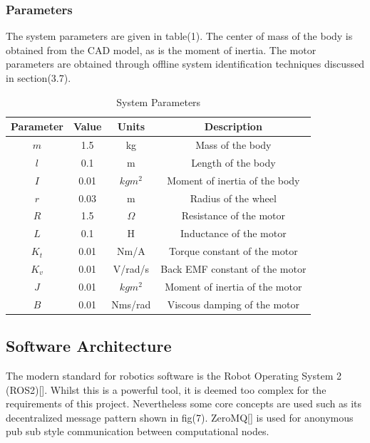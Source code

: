         \subsubsection{Parameters}
        The system parameters are given in table(1). The center of mass of the body is obtained from the CAD model,
        as is the moment of inertia. The motor parameters are obtained through offline system identification techniques
        discussed in section(3.7). 
        \begin{table} [H]
            \centering
            \begin{tabular}{|c|c|c|c|}
                \hline
                Parameter & Value & Units & Description \\
                \hline
                $m$ & 1.5 & kg & Mass of the body \\
                $l$ & 0.1 & m & Length of the body \\
                $I$ & 0.01 & $kgm^2$ & Moment of inertia of the body \\
                $r$ & 0.03 & m & Radius of the wheel \\
                $R$ & 1.5 & $\Omega$ & Resistance of the motor \\
                $L$ & 0.1 & H & Inductance of the motor \\
                $K_t$ & 0.01 & Nm/A & Torque constant of the motor \\
                $K_v$ & 0.01 & V/rad/s & Back EMF constant of the motor \\
                $J$ & 0.01 & $kgm^2$ & Moment of inertia of the motor \\
                $B$ & 0.01 & Nms/rad & Viscous damping of the motor \\
                \hline
            \end{tabular}
            \caption{System Parameters}
        \end{table}
      
        \pagebreak{}
        \subsection{Software Architecture}
        The modern standard for robotics software is the Robot Operating System 2 (ROS2)[]. 
        Whilst this is a powerful tool, it is deemed too complex for the requirements of this project.
        Nevertheless some core concepts are used such as its 
        decentralized message pattern shown in fig(7). ZeroMQ[] is used for 
        anonymous pub sub style communication between computational nodes.

